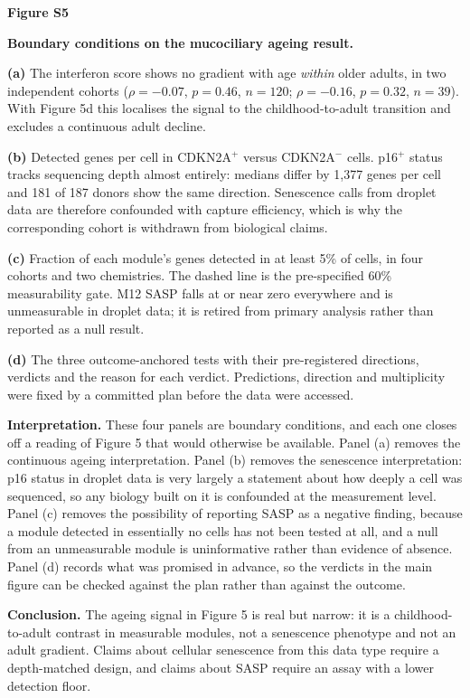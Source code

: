 \documentclass[11pt,a4paper]{article}
\newcommand{\legend}[3]{%
  \clearpage
  {\large\textbf{Figure #1}\par}
  \vspace{2pt}
  {\textbf{#2}\par}
  \vspace{6pt}
  \small #3\par
}
\begin{document}
\legend{S5}{Boundary conditions on the mucociliary ageing result.}{%
\textbf{(a)} The interferon score shows no gradient with age \emph{within} older adults, in
two independent cohorts ($\rho=-0.07$, $p=0.46$, $n=120$; $\rho=-0.16$, $p=0.32$, $n=39$).
With Figure 5d this localises the signal to the childhood-to-adult transition and excludes a
continuous adult decline.
\par
\textbf{(b)} Detected genes per cell in CDKN2A$^{+}$ versus CDKN2A$^{-}$ cells. p16$^{+}$
status tracks sequencing depth almost entirely: medians differ by 1{,}377 genes per cell and
181 of 187 donors show the same direction. Senescence calls from droplet data are therefore
confounded with capture efficiency, which is why the corresponding cohort is withdrawn from
biological claims.
\par
\textbf{(c)} Fraction of each module's genes detected in at least 5\% of cells, in four
cohorts and two chemistries. The dashed line is the pre-specified 60\% measurability gate.
M12 SASP falls at or near zero everywhere and is unmeasurable in droplet data; it is retired
from primary analysis rather than reported as a null result.
\par
\textbf{(d)} The three outcome-anchored tests with their pre-registered directions, verdicts
and the reason for each verdict. Predictions, direction and multiplicity were fixed by a
committed plan before the data were accessed.
\par
\textbf{Interpretation.} These four panels are boundary conditions, and each one closes off a
reading of Figure 5 that would otherwise be available. Panel (a) removes the continuous
ageing interpretation. Panel (b) removes the senescence interpretation: p16 status in droplet
data is very largely a statement about how deeply a cell was sequenced, so any biology built
on it is confounded at the measurement level. Panel (c) removes the possibility of reporting
SASP as a negative finding, because a module detected in essentially no cells has not been
tested at all, and a null from an unmeasurable module is uninformative rather than evidence
of absence. Panel (d) records what was promised in advance, so the verdicts in the main
figure can be checked against the plan rather than against the outcome.
\par
\textbf{Conclusion.} The ageing signal in Figure 5 is real but narrow: it is a
childhood-to-adult contrast in measurable modules, not a senescence phenotype and not an
adult gradient. Claims about cellular senescence from this data type require a depth-matched
design, and claims about SASP require an assay with a lower detection floor.}
\end{document}
